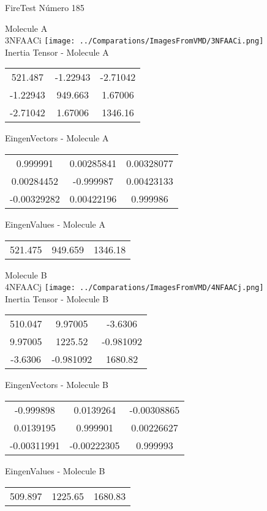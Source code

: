 \vtab[-2cm]
\begin{center}
{\large FireTest \tab Número 185}
\end{center}
\begin{multicols}{2}
\begin{center}

Molecule A \\ 
3NFAACi
\texttt{[image: ../Comparations/ImagesFromVMD/3NFAACi.png]}
\\
Inertia Tensor - Molecule A \\
\vtab

\begin{tabular}{|c c c|}
521.487	 & 	-1.22943	 & 	-2.71042	 \\
-1.22943	 & 	949.663	 & 	1.67006	 \\
-2.71042	 & 	1.67006	 & 	1346.16
\end{tabular}

\vtab
 EingenVectors - Molecule A     \\
\vtab
\begin{tabular}{|c c c|}
0.999991	 & 	0.00285841	 & 	0.00328077	 \\
0.00284452	 & 	-0.999987	 & 	0.00423133	 \\
-0.00329282	 & 	0.00422196	 & 	0.999986
\end{tabular}

\vtab
 EingenValues - Molecule A     \\
\vtab
\begin{tabular}{|c c c|}
521.475	 & 	949.659	 & 	1346.18	 \\
\end{tabular}
\columnbreak

Molecule B \\ 
4NFAACj
\texttt{[image: ../Comparations/ImagesFromVMD/4NFAACj.png]}
\\
Inertia Tensor - Molecule B \\
\vtab

\begin{tabular}{|c c c|}
510.047	 & 	9.97005	 & 	-3.6306	 \\
9.97005	 & 	1225.52	 & 	-0.981092	 \\
-3.6306	 & 	-0.981092	 & 	1680.82
\end{tabular}

\vtab
 EingenVectors - Molecule B     \\
\vtab
\begin{tabular}{|c c c|}
-0.999898	 & 	0.0139264	 & 	-0.00308865	 \\
0.0139195	 & 	0.999901	 & 	0.00226627	 \\
-0.00311991	 & 	-0.00222305	 & 	0.999993
\end{tabular}

\vtab
 EingenValues - Molecule B     \\
\vtab
\begin{tabular}{|c c c|}
509.897	 & 	1225.65	 & 	1680.83	 \\
\end{tabular}

\end{center}
\end{multicols}

